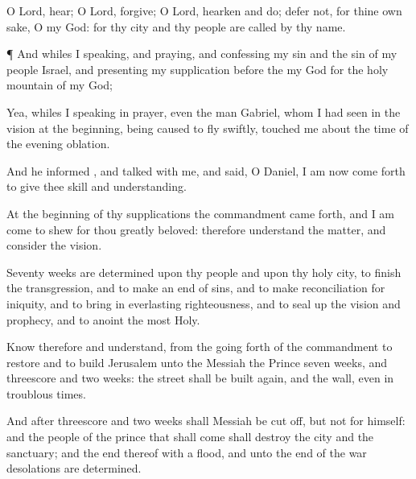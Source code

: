 {O
Lord,
hear; O
Lord,
forgive; O
Lord,
hearken and
do;
defer
not, for thine own sake, O my
God: for thy
city and thy
people are
called by thy
name.


\par }{\PP {}¶ And whiles I
{}
speaking, and
praying, and
confessing my
sin and the
sin of my
people
Israel, and
presenting my
supplication
before the
{} my
God for the
holy
mountain of my
God;

Yea, whiles I
{}
speaking in
prayer, even the
man
Gabriel, whom I had
seen in the
vision at the
beginning, being caused to
fly
swiftly,
touched me about the
time of the
evening
oblation.

And he
informed
{}, and
talked with me, and
said, O
Daniel, I am now come
forth to give thee
skill and
understanding.

At the
beginning of thy
supplications the
commandment came
forth, and I am
come to
shew
{} for thou
{} greatly
beloved: therefore
understand the
matter, and
consider the
vision.

Seventy
weeks are
determined upon thy
people and upon thy
holy
city, to
finish the
transgression, and to make an
end of
sins, and to make
reconciliation for
iniquity, and to bring
in
everlasting
righteousness, and to seal
up the
vision and
prophecy, and to
anoint the
most
Holy.

Know therefore and
understand,
{} from the going
forth of the
commandment to
restore and to
build
Jerusalem unto the
Messiah the
Prince
{}
seven
weeks, and
threescore and
two
weeks: the
street shall be
built
again, and the
wall, even in
troublous
times.

And
after
threescore and
two
weeks shall
Messiah be cut
off, but not for himself: and the
people of the
prince that shall
come shall
destroy the
city and the
sanctuary; and the
end thereof
{} with a
flood, and unto the
end of the
war
desolations are
determined.

}

